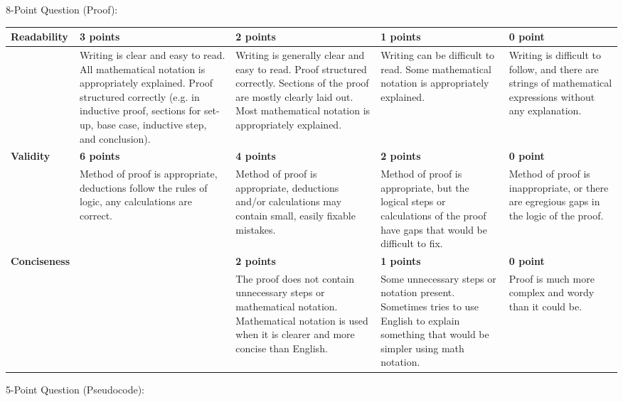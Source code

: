 \documentclass[12pt,landscape]{article}
\begin{document}
{\large 8-Point Question (Proof):}


{\renewcommand{\arraystretch}{2}
\begin{tabular}{|p{2.3cm}|p{4.2cm}|p{4.2cm}|p{4.2cm}|p{4.2cm}|}
\hline
{\bf Readability } & {\bf 3 points} & {\bf 2 points} & {\bf 1 points} & {\bf 0 point} \\
\hline
& 
 Writing is clear and easy to read. All mathematical notation is appropriately explained. Proof structured correctly (e.g. in inductive proof, sections for set-up, base case, inductive step, and conclusion). & 
 Writing is generally clear and easy to read. Proof structured correctly. Sections of the proof are mostly clearly laid out. Most mathematical notation is appropriately explained.& 
 Writing can be difficult to read. Some mathematical notation is appropriately explained. & 
 Writing is difficult to follow, and there are strings of mathematical expressions without any explanation.\\
\hline
{\bf Validity } & {\bf 6 points} & {\bf 4 points} & {\bf 2 points} & {\bf 0 point} \\
\hline
& 
Method of proof is appropriate, deductions follow the rules of logic, any calculations are correct. & 
Method of proof is appropriate, deductions and/or calculations may contain small, easily fixable mistakes. & 
Method of proof is appropriate, but the logical steps or calculations of the proof have gaps that would be difficult to fix. & 
Method of proof is inappropriate, or there are egregious gaps in the logic of the proof.\\
\hline
{\bf Conciseness} & & {\bf 2 points} & {\bf 1 points} & {\bf 0 point} \\
\hline
 &

&
The proof does not contain unnecessary steps or mathematical notation. Mathematical notation is used when it is clearer and more concise than English.
&
Some unnecessary steps or notation present. Sometimes tries to use English to explain something that would be simpler using math notation.
&
Proof is much more complex and wordy than it could be.\\
\hline
 \end{tabular}
}




\newpage

{\large 5-Point Question (Pseudocode):}
\end{document}
